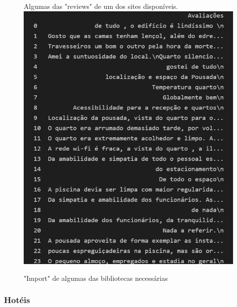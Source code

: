\documentclass[a4paper,10pt]{article}
\begin{document}
\begin{figure}[!htb]
Algumas das "reviews" de um dos sites disponíveis.
    \centering
    \includegraphics[width=15cm]{10.PNG}
    \caption{"Import" de algumas das bibliotecas necessárias}
    \label{fig:my_label}
\end{figure}

\newpage

\subsubsection{Hotéis}
\end{document}
